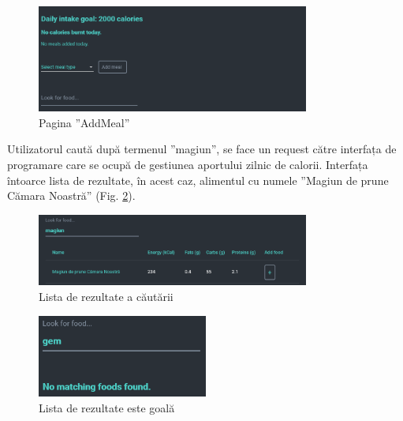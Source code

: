 \begin{figure}[!htb]
	\centering
	\includegraphics[width=0.8\textwidth]
	{../LaTeX/Images/App/add.PNG}
	\caption{Pagina ”AddMeal”}
	\label{fig:76}
\end{figure}

Utilizatorul caută după termenul ”magiun”, se face un request către interfața de programare care se ocupă de gestiunea aportului zilnic de calorii. Interfața întoarce lista de rezultate, în acest caz, alimentul cu numele ”Magiun de prune Cămara Noastră” (Fig. \ref{fig:77}).

\begin{figure}[!htb]
	\centering
	\includegraphics[width=0.8\textwidth]
	{../LaTeX/Images/App/add_magiun.PNG}
	\caption{Lista de rezultate a căutării}
	\label{fig:77}
\end{figure}

\begin{figure}[!htb]
	\centering
	\includegraphics[width=0.5\textwidth]
	{../LaTeX/Images/App/add_gem.PNG}
	\caption{Lista de rezultate este goală}
	\label{fig:78}
\end{figure}

